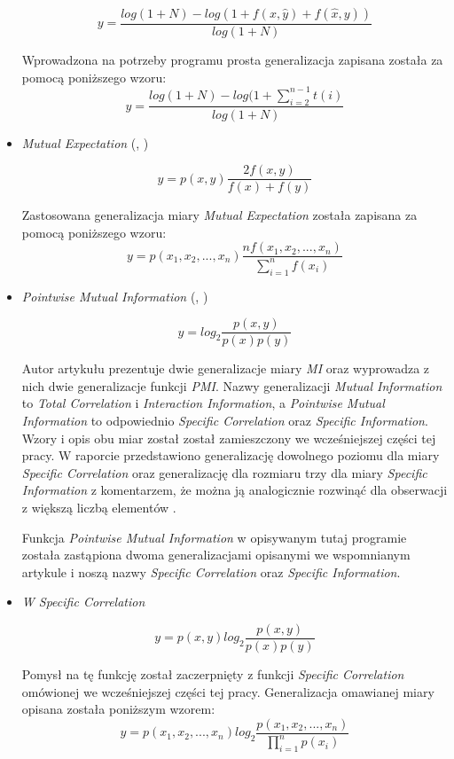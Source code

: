 \documentclass[11pt,a4paper]{llncs}
\begin{document}
\begin{itemize}
$$ y = \frac{ log(1 + N) - log(1 + f(x, \hat{y}) + f(\hat{x}, y)) }{log(1 + N)} $$


Wprowadzona na potrzeby programu prosta generalizacja zapisana została za pomocą poniższego wzoru:
$$ y = \frac{ log(1 + N) - log(1 + \sum_{i = 2}^{n - 1} t(i) }{log(1 + N)} $$


\item \emph{Mutual Expectation} (\cite[str. 18]{pecina_measures}, \cite{mutual_expectation})

$$ y = p(x, y) \frac{2f(x, y)}{f(x) + f(y)}$$

Zastosowana generalizacja miary \emph{Mutual Expectation} została zapisana za pomocą poniższego wzoru:
$$ y = p(x_{1}, x_{2}, ..., x_{n})\frac{nf(x_{1}, x_{2}, ..., x_{n})}{\sum_{i = 1}^{n} f(x_{i})} $$


\item \emph{Pointwise Mutual Information} (\cite[str. 18]{pecina_measures}, \cite[str. 2]{mmi_w11})

$$ y = log_{2}\frac{p(x, y)}{p(x)p(y)} $$

Autor artykułu \cite{mmi_w11} prezentuje dwie generalizacje miary \emph{MI} oraz wyprowadza z nich dwie generalizacje funkcji \emph{PMI}.
Nazwy generalizacji \emph{Mutual Information} to \emph{Total Correlation} i \emph{Interaction Information}, a \emph{Pointwise Mutual Information} to odpowiednio \emph{Specific Correlation} oraz \emph{Specific Information}. Wzory i opis obu miar został został zamieszczony we wcześniejszej części tej pracy.
W raporcie przedstawiono generalizację dowolnego poziomu dla miary \emph{Specific Correlation} oraz generalizację dla rozmiaru trzy dla miary \emph{Specific Information} z komentarzem, że można ją analogicznie rozwinąć dla obserwacji z większą liczbą elementów \cite[str. 3]{mmi_w11}.


Funkcja \emph{Pointwise Mutual Information} w opisywanym tutaj programie została zastąpiona dwoma generalizacjami opisanymi we wspomnianym artykule \cite{mmi_w11} i noszą nazwy \emph{Specific Correlation} oraz \emph{Specific Information}. 


\item \emph{W Specific Correlation}

$$ y = p(x, y) log_{2}\frac{p(x, y)}{p(x)p(y)} $$


Pomysł na tę funkcję został zaczerpnięty z funkcji \emph{Specific Correlation} omówionej we wcześniejszej części tej pracy.
Generalizacja omawianej miary opisana została poniższym wzorem:
$$ y = p(x_{1}, x_{2}, ..., x_{n}) log_{2}\frac{p(x_{1}, x_{2}, ..., x_{n})}{\prod_{i = 1}^{n} p(x_{i})} $$



\end{itemize}
\end{document}
